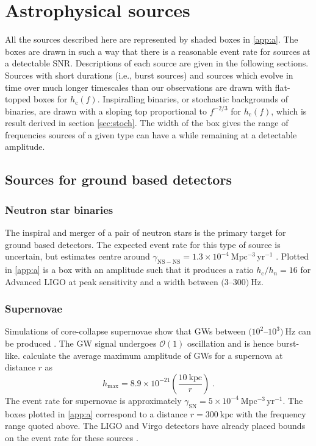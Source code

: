 \section{Astrophysical sources}\label{sec:sources}

All the sources described here are represented by shaded boxes in \ref{app:a}. The boxes are drawn in such a way that there is a reasonable event rate for sources at a detectable SNR. Descriptions of each source are given in the following sections. Sources with short durations (i.e., burst sources) and sources which evolve in time over much longer timescales than our observations are drawn with flat-topped boxes for $h_\mathrm{c}(f)$. Inspiralling binaries, or stochastic backgrounds of binaries, are drawn with a sloping top proportional to $f^{-2/3}$ for $h_\mathrm{c}(f)$, which is result derived in section \ref{sec:stoch}. The width of the box gives the range of frequencies sources of a given type can have a while remaining at a detectable amplitude.

\subsection{Sources for ground based detectors}

\subsubsection{Neutron star binaries}

The inspiral and merger of a pair of neutron stars is the primary target for ground based detectors. The expected event rate for this type of source is uncertain, but estimates centre around $\gamma_{\mathrm{NS-NS}}=1.3\times 10^{-4}~\mathrm{Mpc^{-3}\,yr^{-1}}$ \citep{CBC}. Plotted in \ref{app:a} is a box with an amplitude such that it produces a ratio $h_\mathrm{c}/h_{n}=16$ for Advanced LIGO at peak sensitivity and a width between $(3$--$300)~\mathrm{Hz}$.

\subsubsection{Supernovae}

Simulations of core-collapse supernovae show that GWs between $(10^{2}$--$10^{3})~\mathrm{Hz}$ can be produced \citep{Kotake2006}. The GW signal undergoes ${\mathcal{O}}(1)$ oscillation and is hence burst-like. \citet{2002A&A...393..523D} calculate the average maximum amplitude of GWs for a supernova at distance $r$ as
\begin{equation}
h_\mathrm{max} = 8.9\times 10^{-21}\left( \frac{10~\mathrm{kpc}}{r} \right) \; .
\end{equation}
The event rate for supernovae is approximately $\gamma_{\mathrm{SN}} = 5\times10^{-4}~\mathrm{Mpc^{-3}\,yr^{-1}}$. The boxes plotted in \ref{app:a} correspond to a distance $r=300~\mathrm{kpc}$ with the frequency range quoted above. The LIGO and Virgo detectors have already placed bounds on the event rate for these sources \citep{Bursts}.

